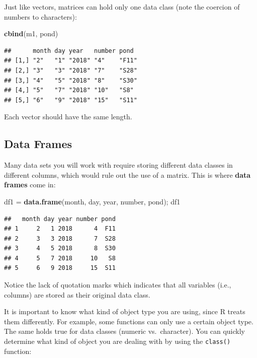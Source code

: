 \documentclass[]{book}
\newenvironment{Shaded}{\begin{snugshade}}{\end{snugshade}}
\newcommand{\KeywordTok}[1]{\textcolor[rgb]{0.13,0.29,0.53}{\textbf{#1}}}
\newcommand{\NormalTok}[1]{#1}
\newcommand{\StringTok}[1]{\textcolor[rgb]{0.31,0.60,0.02}{#1}}
\begin{document}
Just like vectors, matrices can hold only one data class (note the coercion of numbers to characters):

\begin{Shaded}
\begin{Highlighting}[]
\KeywordTok{cbind}\NormalTok{(m1, pond)}
\end{Highlighting}
\end{Shaded}

\begin{verbatim}
##      month day year   number pond 
## [1,] "2"   "1" "2018" "4"    "F11"
## [2,] "3"   "3" "2018" "7"    "S28"
## [3,] "4"   "5" "2018" "8"    "S30"
## [4,] "5"   "7" "2018" "10"   "S8" 
## [5,] "6"   "9" "2018" "15"   "S11"
\end{verbatim}

Each vector should have the same length.

\hypertarget{data-frames}{%
\subsection{Data Frames}\label{data-frames}}

Many data sets you will work with require storing different data classes in different columns, which would rule out the use of a matrix. This is where \textbf{data frames} come in:

\begin{Shaded}
\begin{Highlighting}[]
\NormalTok{df1 =}\StringTok{ }\KeywordTok{data.frame}\NormalTok{(month, day, year, number, pond); df1}
\end{Highlighting}
\end{Shaded}

\begin{verbatim}
##   month day year number pond
## 1     2   1 2018      4  F11
## 2     3   3 2018      7  S28
## 3     4   5 2018      8  S30
## 4     5   7 2018     10   S8
## 5     6   9 2018     15  S11
\end{verbatim}

Notice the lack of quotation marks which indicates that all variables (i.e., columns) are stored as their original data class.

It is important to know what kind of object type you are using, since R treats them differently. For example, some functions can only use a certain object type. The same holds true for data classes (numeric vs.~character). You can quickly determine what kind of object you are dealing with by using the \texttt{class()} function:
\end{document}
